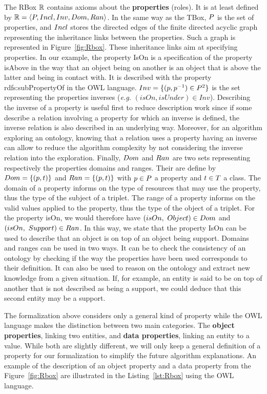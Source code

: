 The RBox $\mathbb{R}$ contains axioms about the \textbf{properties} (roles). It is at least defined by $\mathbb{R} = \langle P, Incl, Inv, Dom, Ran \rangle$. In the same way as the TBox, $P$ is the set of properties, and $Incl$ stores the directed edges of the finite directed acyclic graph representing the inheritance links between the properties. Such a graph is represented in Figure~\ref{fig:Rbox}. These inheritance links aim at specifying properties. In our example, the property IsOn is a specification of the property isAbove in the way that an object being on another is an object that is above the latter and being in contact with. It is described with the property rdfs:subPropertyOf in the OWL language. 
$Inv = \{(p, p^{-1}) \in P^2\}$ is the set representing the properties inverses (\textit{e.g.} $(isOn, isUnder) \in Inv$). Describing the inverse of a property is useful first to reduce description work since if some describe a relation involving a property for which an inverse is defined, the inverse relation is also described in an underlying way. Moreover, for an algorithm exploring an ontology, knowing that a relation uses a property having an inverse can allow to reduce the algorithm complexity by not considering the inverse relation into the exploration.
Finally, $Dom$ and $Ran$ are two sets representing respectively the properties domains and ranges. Their are define by $Dom = \{(p, t)\}$ and $Ran = \{(p, t)\}$ with $p \in P$ a property and $t \in T$ a class. The domain of a property informs on the type of resources that may use the property, thus the type of the subject of a triplet. The range of a property informs on the valid values applied to the property, thus the type of the object of a triplet. For the property isOn, we would therefore have $(isOn,\ Object) \in Dom$ and $(isOn,\ Support) \in Ran$. In this way, we state that the property IsOn can be used to describe that an object is on top of an object being support. Domains and ranges can be used in two ways. It can be to check the consistency of an ontology by checking if the way the properties have been used corresponds to their definition. It can also be used to reason on the ontology and extract new knowledge from a given situation. If, for example, an entity is said to be on top of another that is not described as being a support, we could deduce that this second entity may be a support.

The formalization above considers only a general kind of property while the OWL language makes the distinction between two main categories. The \textbf{object properties}, linking two entities, and \textbf{data properties}, linking an entity to a value. While both are slightly different, we will only keep a general definition of a property for our formalization to simplify the future algorithm explanations. An example of the description of an object property and a data property from the Figure~\ref{fig:Rbox} are illustrated in the Listing~\ref{lst:Rbox} using the OWL language.

